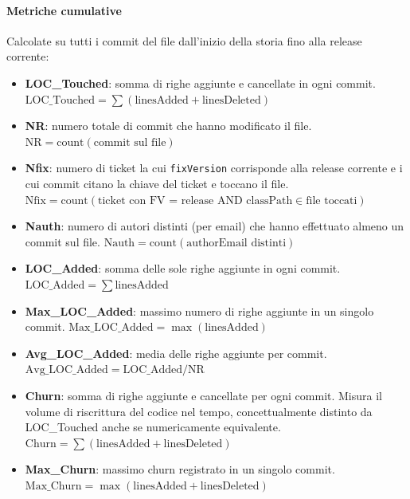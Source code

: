 \paragraph{Metriche cumulative}
Calcolate su tutti i commit del file dall'inizio della storia fino alla release corrente:

\begin{itemize}
    \item \textbf{LOC\_Touched}: somma di righe aggiunte e cancellate in ogni commit.
    $\text{LOC\_Touched} = \sum (\text{linesAdded} + \text{linesDeleted})$

    \item \textbf{NR}: numero totale di commit che hanno modificato il file.
    $\text{NR} = \text{count}(\text{commit sul file})$

    \item \textbf{Nfix}: numero di ticket la cui \texttt{fixVersion} corrisponde alla
    release corrente e i cui commit citano la chiave del ticket e toccano il file.\\
    $\text{Nfix} = \text{count}(\text{ticket con FV = release AND classPath} \in \text{file toccati})$

    \item \textbf{Nauth}: numero di autori distinti (per email) che hanno effettuato
    almeno un commit sul file.
    $\text{Nauth} = \text{count}(\text{authorEmail distinti})$

    \item \textbf{LOC\_Added}: somma delle sole righe aggiunte in ogni commit.
    $\text{LOC\_Added} = \sum \text{linesAdded}$

    \item \textbf{Max\_LOC\_Added}: massimo numero di righe aggiunte in un singolo commit.
    $\text{Max\_LOC\_Added} = \max(\text{linesAdded})$

    \item \textbf{Avg\_LOC\_Added}: media delle righe aggiunte per commit.
    $\text{Avg\_LOC\_Added} = \text{LOC\_Added} / \text{NR}$

    \item \textbf{Churn}: somma di righe aggiunte e cancellate per ogni commit. Misura
    il volume di riscrittura del codice nel tempo, concettualmente distinto da LOC\_Touched
    anche se numericamente equivalente.
    $\text{Churn} = \sum (\text{linesAdded} + \text{linesDeleted})$

    \item \textbf{Max\_Churn}: massimo churn registrato in un singolo commit.
    $\text{Max\_Churn} = \max(\text{linesAdded} + \text{linesDeleted})$


\end{itemize}
